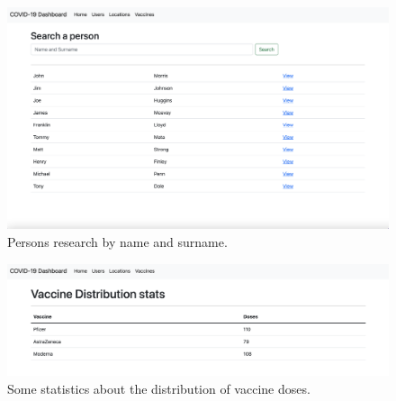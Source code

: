\documentclass{article}
\begin{document}
\begin{figure}[ht!]
    \centering
    \includegraphics[scale=0.3]{smbud-contact tracing app latex code/screenshots/searchperson.png}
    \caption{Persons research by name and surname.}
\end{figure}
\begin{figure}[ht!]
    \centering
    \includegraphics[scale=0.3]{smbud-contact tracing app latex code/screenshots/vaccines.png}
    \caption{Some statistics about the distribution of vaccine doses.}
\end{figure}
\end{document}
